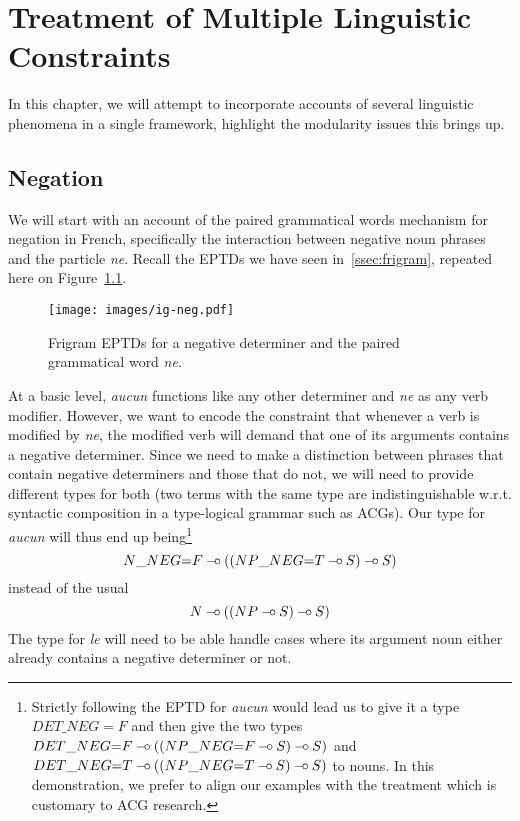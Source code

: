 \chapter{Treatment of Multiple Linguistic Constraints}
\label{chap:constraints}

In this chapter, we will attempt to incorporate accounts of several
linguistic phenomena in a single framework, highlight the modularity
issues this brings up.

\section{Negation}
\label{sec:negation}

We will start with an account of the paired grammatical words mechanism
for negation in French, specifically the interaction between negative
noun phrases and the particle \emph{ne}. Recall the EPTDs we have seen
in~\ref{ssec:frigram}, repeated here on Figure~\ref{fig:ig-neg-rep}.

\begin{figure}
  \centering
  \texttt{[image: images/ig-neg.pdf]}
  \caption{\label{fig:ig-neg-rep} Frigram EPTDs for a negative
    determiner and the paired grammatical word \emph{ne}.}
\end{figure}

At a basic level, \emph{aucun} functions like any other determiner and
\emph{ne} as any verb modifier. However, we want to encode the
constraint that whenever a verb is modified by \emph{ne}, the modified
verb will demand that one of its arguments contains a negative
determiner. Since we need to make a distinction between phrases that
contain negative determiners and those that do not, we will need to
provide different types for both (two terms with the same type are
indistinguishable w.r.t. syntactic composition in a type-logical grammar
such as ACGs). Our type for \emph{aucun} will thus end up
being\footnote{Strictly following the EPTD for \emph{aucun} would lead
  us to give it a type $DET\_NEG{=}F$ and then give the two types
  $DET\_NEG{=}F \mathbin{{-}\mkern-3.5mu{\circ}} ((NP\_NEG{=}F \mathbin{{-}\mkern-3.5mu{\circ}} S) \mathbin{{-}\mkern-3.5mu{\circ}} S)$ and $DET\_NEG{=}T
  \mathbin{{-}\mkern-3.5mu{\circ}} ((NP\_NEG{=}T \mathbin{{-}\mkern-3.5mu{\circ}} S) \mathbin{{-}\mkern-3.5mu{\circ}} S)$ to nouns. In this
  demonstration, we prefer to align our examples with the treatment
  which is customary to ACG research.} $$N\_NEG{=}F \mathbin{{-}\mkern-3.5mu{\circ}} ((NP\_NEG{=}T
\mathbin{{-}\mkern-3.5mu{\circ}} S) \mathbin{{-}\mkern-3.5mu{\circ}} S)$$ instead of the usual $$N \mathbin{{-}\mkern-3.5mu{\circ}} ((NP \mathbin{{-}\mkern-3.5mu{\circ}} S) \mathbin{{-}\mkern-3.5mu{\circ}}
S)$$ The type for \emph{le} will need to be able handle cases where its
argument noun either already contains a negative determiner or not.


